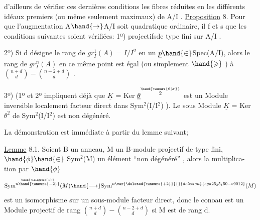 d'ailleurs de vérifier ces dernières conditions  les fibres réduites
en les différents idéaux premiers (ou même seulement maximaux) de A/I .
\uline{Proposition} 8. Pour que l'augmentation A$\hand{\rightarrow}$A/I soit  quadratique
ordinaire, il f et s que les conditions suivantes soient vérifiées:
1º)   projectifsde type fini sur A/I .

2º) Si d désigne le rang de $gr^{1}_{I}(A) = I/I^{2}$ en un $\underline{p} \hand{\in}$Spec(A/I),
alors le rang de $gr^{n}_{I}(A)$ en ce même point est égal (ou simplement
$\hand{\geqslant}$ ) à $\binom{n+d}{d} - \binom{n-2+d}{d}$ .

3º) (1º et 2º impliquent déjà que $\underline{K}$ = Ker $\underline{\theta}^{\overset{\hand{\unsure{6|\sigma}}}{2}}$ est un Module
inversible localement facteur direct dans  Sym$^{2}$(I/I$^{2}$) ). Le sous
Module $\underline{K}$ = Ker $\theta^{2}$ de Sym$^{2}$(I/I$^{2}$) est non dégénéré.

La démonstration est immédiate à partir du lemme suivant; 

 \uline{Lemme} 8.1. Soient B un anneau, M un B-module projectif de
type fini, $\hand{\phi} \hand{\in}$ Sym$^{2}$(M) un élément ``non dégénéré'' , alors la multiplica-%
tion par $\hand{\phi}$
\[ \mathrm{Sym}^{\overset{\hand{\illegible{1}}}{n\hand{\unsure{-2}}}}(M) \hand{\longrightarrow} \mathrm{Sym}^{n\var{\deleted{\unsure{+2}}}{}{deletion}{ega25_25_150-v0012}}(M) \]
est un isomorphisme sur un sous-module facteur direct, donc le conoau
est un Module projectif de rang $\binom{n+d}{d} - \binom{n-2+d}{d}$ si M est de rang d.

